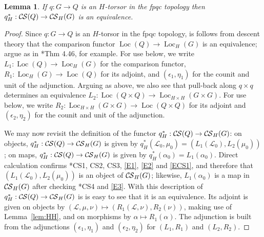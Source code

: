 \documentclass[10pt]{amsart}
\theoremstyle{plain}
\newtheorem{lemma}[theorem]{Lemma}
\theoremstyle{definition}
\newcommand{\Fq}{k}
\DeclareMathOperator{\Loc}{Loc}
\newcommand{\cs}[1]{{\mathcal{#1}}}
\newcommand{\CS}{{\mathcal{C\hskip-0.8pt S}}}
\begin{document}
\begin{lemma}\label{lem:torsor}
If $q : G \to Q$ is an $H$-torsor in the fpqc topology 
then $q_H^*: \CS(Q) \to \CS_H(G)$ is an equivalence.
\end{lemma}

\begin{proof}
Since $q : G\to Q$ is an $H$-torsor in the fpqc topology, is follows from descent theory that the comparison functor $\Loc(Q) \to \Loc_H(G)$ is an equivalence; argue as in \cite{Vistoli:notes}*{Thm 4.46}, for example.
%
For use below, we write $L_1 : \Loc(Q) \to \Loc_H(G)$ for the comparison functor, $R_1 : \Loc_H(G) \to \Loc(Q)$ for its adjoint, and $(\epsilon_1, \eta_1)$ for the counit and unit of the adjunction.
%
Arguing as above, we also see that pull-back along $q\times q$ determines an equivalence $L_2 : \Loc(Q\times Q) \to \Loc_{H\times H}(G\times G)$.
For use below, we write $R_2 : \Loc_{H\times H}(G\times G) \to \Loc(Q\times Q)$ for its adjoint and $(\epsilon_2, \eta_2)$ for the counit and unit of the adjunction.

We may now revisit the definition of the functor $q_H^*: \CS(Q)\to \CS_H(G)$:
on objects, $q_H^*: \CS(Q)\to \CS_H(G)$ is given by $q_H^*(\cs{L}_0,\mu_0) = (L_1(\cs{L}_0), L_2(\mu_0))$; on maps, $q_H^*: \CS(Q)\to \CS_H(G)$ is given by $q_H^*(\alpha_0) = L_1(\alpha_0)$.
Direct calculation confirms \cite{cunningham-roe:13a}*{CS1, CS2, CS3}, \eqref{E1}, \eqref{E2} and \eqref{ECS1}, and therefore that $(L_1(\cs{L}_0), L_2(\mu_0))$ is an object of $\CS_H(G)$; 
likewise, $L_1(\alpha_0)$ is a map in $\CS_H(G)$ after checking \cite{cunningham-roe:13a}*{CS4} and \eqref{E3}.
%
With this description of $q_H^*: \CS(Q)\to \CS_H(G)$ is is easy to see that it is an equivalence.
Its adjoint is given on objects by $(\cs{L},\mu,\nu) \mapsto (R_1(\cs{L},\nu), R_2(\nu))$, making use of Lemma~\ref{lem:HH}, and on morphisms by $\alpha \mapsto R_1(\alpha)$.
The adjunction is built from the adjunctions $(\epsilon_1, \eta_1)$ and $(\epsilon_2, \eta_2)$ for $(L_1,R_1)$ and $(L_2, R_2)$.
\end{proof}
\end{document}
